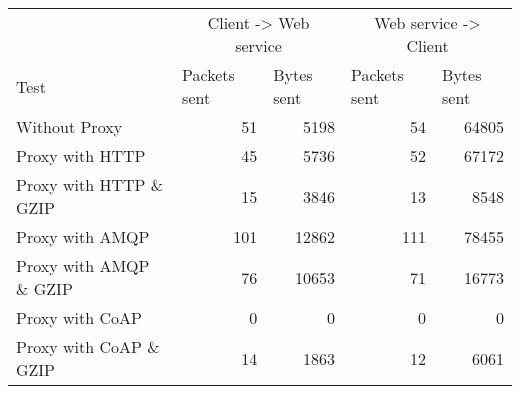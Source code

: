 \begin{tabular}{lrrrr}
\hline
\multicolumn{1}{l}{}                  & \multicolumn{2}{c}{Client -> Web service}                           & \multicolumn{2}{c}{Web service -> Client}                           \\
\multicolumn{1}{l}{Test} & \multicolumn{1}{l}{Packets sent} & \multicolumn{1}{l}{Bytes sent} & \multicolumn{1}{l}{Packets sent} & \multicolumn{1}{l}{Bytes sent} \\ \hline
Without Proxy                   & 51             & 5198           & 54             & 64805          \\
Proxy with HTTP                 & 45             & 5736           & 52             & 67172          \\
Proxy with HTTP \& GZIP         & 15             & 3846           & 13             & 8548           \\
Proxy with AMQP                 & 101            & 12862          & 111            & 78455          \\
Proxy with AMQP \& GZIP         & 76             & 10653          & 71             & 16773          \\
Proxy with CoAP                 & 0              & 0              & 0              & 0              \\
Proxy with CoAP \& GZIP         & 14             & 1863           & 12             & 6061           \\
\end{tabular}